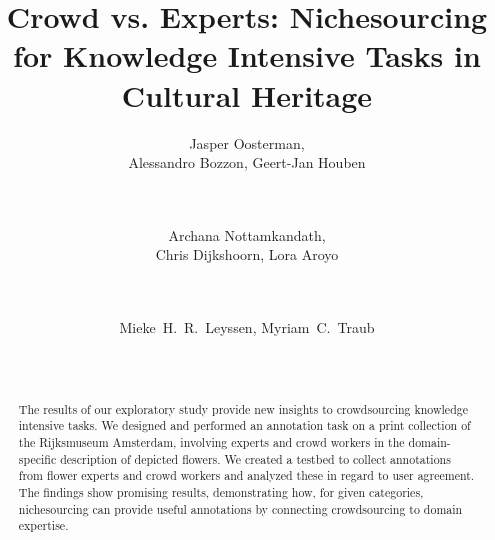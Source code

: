 \documentclass{sig-alternate-2013}
\begin{document}
\title{Crowd vs. Experts: Nichesourcing for Knowledge Intensive Tasks in Cultural Heritage}

\author{
\alignauthor 
Jasper Oosterman, \\Alessandro Bozzon, Geert-Jan Houben \\
        \\
        \\
\and
\alignauthor Archana Nottamkandath, 	\\Chris Dijkshoorn, Lora Aroyo \\
        \\
        \\
\and  %
\alignauthor  Mieke~H.~R.~Leyssen, Myriam~C.~Traub \\
       \\
       \\
       }

\maketitle   
       
\begin{abstract}
The results of our exploratory study provide new insights to crowdsourcing knowledge intensive tasks. 
We designed and performed an annotation task on a print collection of the Rijks\-museum Amsterdam, involving experts and crowd workers in the domain-specific description of depicted flowers. 
We created a testbed to collect annotations from flower experts and crowd workers and analyzed these in regard to user agreement. 
The findings show promising results, demonstrating how, for given categories, nichesourcing can provide useful annotations by connecting crowdsourcing to domain expertise. 
\end{abstract}


\end{document}
